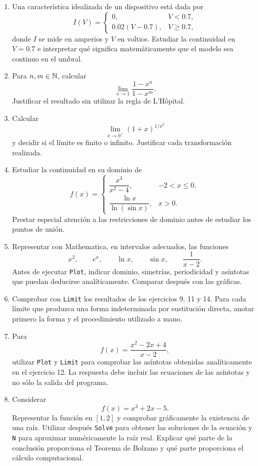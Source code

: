 \begin{enumerate}[label=\textbf{\arabic*.},leftmargin=*]
\item Una característica idealizada de un dispositivo está dada por
\[
I(V)=
\begin{cases}
0,&V<0.7,\\
0.02(V-0.7),&V\geq0.7,
\end{cases}
\]
donde $I$ se mide en amperios y $V$ en voltios. Estudiar la continuidad en $V=0.7$ e interpretar qué significa matemáticamente que el modelo sea continuo en el umbral.

\item Para $n,m\in\mathbb{N}$, calcular
\[
\lim_{x\to1}\frac{1-x^n}{1-x^m}.
\]
Justificar el resultado sin utilizar la regla de L'Hôpital.

\item Calcular
\[
\lim_{x\to0^+}(1+x)^{1/x^2}
\]
y decidir si el límite es finito o infinito. Justificar cada transformación realizada.

\item Estudiar la continuidad en su dominio de
\[
f(x)=
\begin{cases}
\dfrac{x^3}{x^2-4},&-2<x\leq0,\\[2mm]
\dfrac{\ln x}{\ln(\sin x)},&x>0.
\end{cases}
\]
Prestar especial atención a las restricciones de dominio antes de estudiar los puntos de unión.

\item \M Representar con Mathematica, en intervalos adecuados, las funciones
\[
x^2,\qquad e^x,\qquad \ln x,\qquad \sin x,\qquad \frac1{x-2}.
\]
Antes de ejecutar \texttt{Plot}, indicar dominio, simetrías, periodicidad y asíntotas que puedan deducirse analíticamente. Comparar después con las gráficas.

\item \M Comprobar con \texttt{Limit} los resultados de los ejercicios 9, 11 y 14. Para cada límite que produzca una forma indeterminada por sustitución directa, anotar primero la forma y el procedimiento utilizado a mano.

\item \M Para
\[
f(x)=\frac{x^2-2x+4}{x-2},
\]
utilizar \texttt{Plot} y \texttt{Limit} para comprobar las asíntotas obtenidas analíticamente en el ejercicio 12. La respuesta debe incluir las ecuaciones de las asíntotas y no sólo la salida del programa.

\item \M Considerar
\[
f(x)=x^3+2x-5.
\]
Representar la función en $[1,2]$ y comprobar gráficamente la existencia de una raíz. Utilizar después \texttt{Solve} para obtener las soluciones de la ecuación y \texttt{N} para aproximar numéricamente la raíz real. Explicar qué parte de la conclusión proporciona el Teorema de Bolzano y qué parte proporciona el cálculo computacional.

\end{enumerate}
